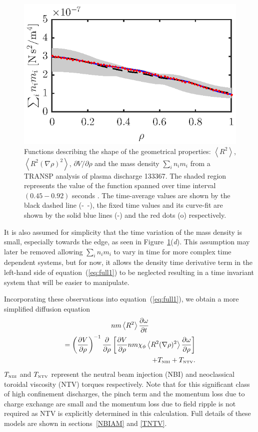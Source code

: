 \documentclass[12pt]{iopart}
\begin{document}
\begin{figure}
\includegraphics{imene_figs/fig1d} \hspace{-3em}
\caption{Functions describing the shape of the geometrical properties: $\left< R^2 \right>$, $\left< R^2 (\nabla\rho)^2 \right>$, $\partial V/\partial \rho$ and  the mass density $ \sum_i n_i m_i $ from a TRANSP analysis of plasma discharge 133367.  The shaded region represents the value of the function spanned over time interval $(0.45-0.92)$ seconds . The time-average values are shown by the black dashed line (-~-), the fixed time values and its curve-fit are shown by the solid blue lines (-) and the red dots (o) respectively.}
\label{fig:geofunc}
\end{figure}

It is also assumed for simplicity that the time variation of the mass density is small, especially towards the edge, as seen in Figure~{\ref{fig:geofunc}}(\emph{d}). 
 This assumption may later be removed allowing $ \sum_i n_i m_i $  to vary in time for more complex time dependent systems, but for now, it allows the density time derivative term in the left-hand side of equation~(\ref{eq:full1}) to be neglected resulting in a time invariant system that will be easier to manipulate.
 
 Incorporating these observations into equation~(\ref{eq:full1}), we obtain a more simplified diffusion equation
\begin{multline}
 n m \left<R^2\right>
 \frac{\partial \omega}{\partial t} \\
 = \left( \frac{\partial V}{\partial\rho}\right)^{-1}
   \frac{\partial}{\partial \rho} 
   \left[\frac{\partial V}{\partial \rho} n m \chi_\phi 
   \left< R^2 (\nabla \rho)^2\right> 
   \frac{\partial\omega}{\partial\rho}\right] \\
   \hfill + T_\textrm{\tiny NBI} + T_\textrm{\tiny NTV}.
		\label{model0}
\end{multline}
$T_\textrm{\tiny NBI} $ and $T_\textrm{\tiny NTV}$ represent the neutral beam injection (NBI) and neoclassical toroidal viscosity (NTV) torques respectively. Note that for this significant class of high confinement discharges, the pinch term and  the momentum loss due to charge exchange are small and the momentum loss due to  field ripple is not required as NTV is explicitly determined in this calculation. Full details of these models are shown in sections~\ref{NBIAM} and \ref{TNTV}.
  
\end{document}
